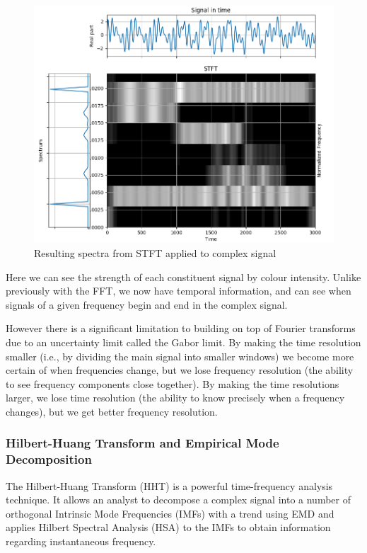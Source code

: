 \documentclass[
  english,
  paper=a4,
  oneside  ,captions=tableheading
]{scrbook}
\begin{document}
\begin{figure}
\centering
\includegraphics{img/stft_output_spectra.png}
\caption{Resulting spectra from STFT applied to complex signal}
\end{figure}

Here we can see the strength of each constituent signal by colour
intensity. Unlike previously with the FFT, we now have temporal
information, and can see when signals of a given frequency begin and end
in the complex signal.

However there is a significant limitation to building on top of Fourier
transforms due to an uncertainty limit called the Gabor limit. By making
the time resolution smaller (i.e., by dividing the main signal into
smaller windows) we become more certain of when frequencies change, but
we lose frequency resolution (the ability to see frequency components
close together). By making the time resolutions larger, we lose time
resolution (the ability to know precisely when a frequency changes), but
we get better frequency resolution.

\hypertarget{hilbert-huang-transform-and-empirical-mode-decomposition}{%
\subsubsection{Hilbert-Huang Transform and Empirical Mode
Decomposition}\label{hilbert-huang-transform-and-empirical-mode-decomposition}}

The Hilbert-Huang Transform (HHT) is a powerful time-frequency analysis
technique. It allows an analyst to decompose a complex signal into a
number of orthogonal Intrinsic Mode Frequencies (IMFs) with a trend
using EMD and applies Hilbert Spectral Analysis (HSA) to the IMFs to
obtain information regarding instantaneous frequency.
\end{document}
